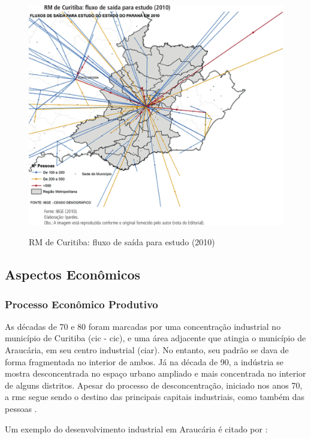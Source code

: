 	\begin{figure}
		\centering
		\caption{RM de Curitiba: fluxo de saída para estudo (2010)}
		\includegraphics[width=1.0\linewidth]{img/costa2015a_08}
		\label{fig:costa2015a_08}
	\end{figure}
	
	\subsection{Aspectos Econômicos}
	
	\subsubsection{Processo Econômico Produtivo}
	
	As décadas de 70 e 80 foram marcadas por uma concentração industrial no município de Curitiba (\glsdesc{cic} - \gls{cic}), e uma área adjacente que atingia o município de Araucária, em seu centro industrial (\gls{ciar}). No entanto, seu padrão se dava de forma fragmentada no interior de ambos. Já na década de 90, a indústria se mostra desconcentrada no espaço urbano ampliado e mais concentrada no interior de alguns distritos. Apesar do processo de desconcentração, iniciado nos anos 70, a \gls{rmc} segue sendo o destino das principais capitais industriais, como também das pessoas \cite{firkowski2002b}.
	
	Um exemplo do desenvolvimento industrial em Araucária é citado por :
	
